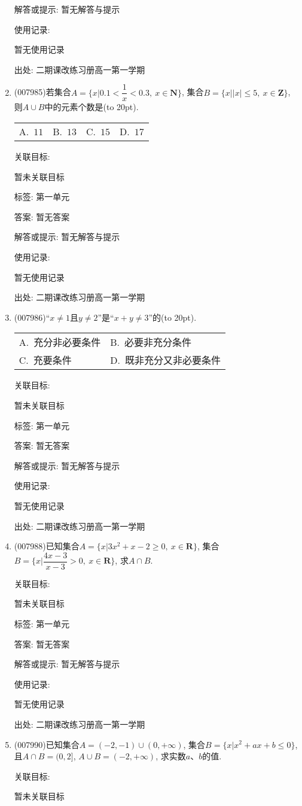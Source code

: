 \documentclass[10pt,a4paper]{article}
\newcommand{\bracket}[1]{(\hbox to #1pt{})}
\newcommand{\twoch}[4]{\par\begin{tabular}{p{.46\textwidth}p{.46\textwidth}}
A.~#1& B.~#2\\
C.~#3& D.~#4
\end{tabular}}
\newcommand{\fourch}[4]{\par\begin{tabular}{p{.23\textwidth}p{.23\textwidth}p{.23\textwidth}p{.23\textwidth}}
A.~#1 &B.~#2& C.~#3& D.~#4
\end{tabular}}
\begin{document}
\begin{enumerate}[1.]
解答或提示: 暂无解答与提示

使用记录:

暂无使用记录


出处: 二期课改练习册高一第一学期
\item { (007985)}若集合$A=\{x|0.1<\dfrac 1x<0.3,\ x\in \mathbf{N}\}$, 集合$B=\{x||x|\le 5,\ x\in \mathbf{Z}\}$, 则$A\cup B$中的元素个数是\bracket{20}.
\fourch{$11$}{$13$}{$15$}{$17$}


关联目标:

暂未关联目标



标签: 第一单元

答案: 暂无答案

解答或提示: 暂无解答与提示

使用记录:

暂无使用记录


出处: 二期课改练习册高一第一学期
\item { (007986)}``$x\ne 1$且$y\ne 2$''是``$x+y\ne 3$''的\bracket{20}.
\twoch{充分非必要条件}{必要非充分条件}{充要条件}{既非充分又非必要条件}


关联目标:

暂未关联目标



标签: 第一单元

答案: 暂无答案

解答或提示: 暂无解答与提示

使用记录:

暂无使用记录


出处: 二期课改练习册高一第一学期
\item { (007988)}已知集合$A=\{x|3x^2+x-2\ge 0,\  x\in \mathbf{R}\}$, 集合$B=\{x|\dfrac{4x-3}{x-3}>0,\ x\in \mathbf{R}\}$, 求$A\cap B$.


关联目标:

暂未关联目标



标签: 第一单元

答案: 暂无答案

解答或提示: 暂无解答与提示

使用记录:

暂无使用记录


出处: 二期课改练习册高一第一学期
\item { (007990)}已知集合$A=(-2,-1)\cup (0,+\infty)$, 集合$B=\{x|x^2+ax+b\le 0\}$, 且$A\cap B=(0,2]$, $A\cup B=(-2,+\infty)$, 求实数$a$、$b$的值.


关联目标:

暂未关联目标




\end{enumerate}
\end{document}
